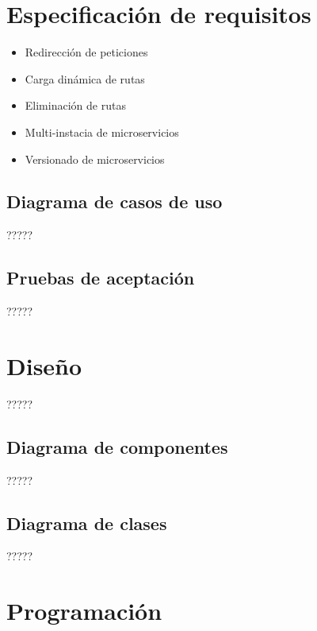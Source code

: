 \documentclass[11pt,spanish,listoffigures]{tfgetsinf}
\begin{document}
\section{Especificación de requisitos}

\begin{itemize}

\item Redirección de peticiones
\item Carga dinámica de rutas
\item Eliminación de rutas
\item Multi-instacia de microservicios
\item Versionado de microservicios

\end{itemize}

\subsection{Diagrama de casos de uso}

?????

\subsection{Pruebas de aceptación}

?????


\section{Diseño}

?????

\subsection{Diagrama de componentes}

?????

\subsection{Diagrama de clases}

?????


\section{Programación}
\end{document}
